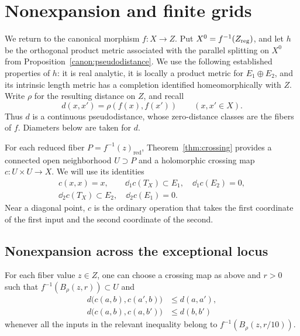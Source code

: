 \section{Nonexpansion and finite grids}\label{app:global}

We return to the canonical morphism $f\colon X\to Z$.  Put
$X^0=f^{-1}(Z_{\mathrm{reg}})$, and let $h$ be the orthogonal product metric
associated with the parallel splitting on $X^0$ from
Proposition~\ref{canon:pseudodistance}.
We use the following established properties of $h$: it is real analytic,
it is locally a product metric for $E_1\oplus E_2$, and its intrinsic
length metric has a completion identified homeomorphically with $Z$.
Write $\rho$ for the resulting distance on $Z$, and recall
\[
 d(x,x')=\rho(f(x),f(x'))\qquad(x,x'\in X).
\]
Thus $d$ is a continuous pseudodistance, whose zero-distance classes are
the fibers of $f$.  Diameters below are taken for $d$.

For each reduced fiber $P=f^{-1}(z)_{\mathrm{red}}$, Theorem~\ref{thm:crossing}
provides a connected open neighborhood $U\supset P$ and a holomorphic
crossing map $c\colon U\times U\to X$.  We will use its identities
\begin{equation}\label{global:crossing-identities}
 \begin{gathered}
 c(x,x)=x,\qquad
 \dd_1c(T_X)\subset E_1,\quad \dd_1c(E_2)=0,\\
 \dd_2c(T_X)\subset E_2,\quad \dd_2c(E_1)=0.
 \end{gathered}
\end{equation}
Near a diagonal point, $c$ is the ordinary operation that takes the first
coordinate of the first input and the second coordinate of the second.

\subsection{Nonexpansion across the exceptional locus}

\begin{lemma}\label{global:nonexpansion}
For each fiber value $z\in Z$, one can choose a crossing map as above and
$r>0$ such that $f^{-1}(B_{\rho}(z,r))\subset U$ and
\begin{equation}\label{global:lipschitz}
 \begin{split}
 d\bigl(c(a,b),c(a',b)\bigr)&\leq d(a,a'),\\
 d\bigl(c(a,b),c(a,b')\bigr)&\leq d(b,b')
 \end{split}
\end{equation}
whenever all the inputs in the relevant inequality belong to
$f^{-1}(B_{\rho}(z,r/10))$.
\end{lemma}

